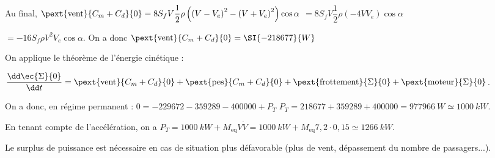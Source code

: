 \begin{multicols}{2}
\begin{corrige}
Au final, $\pext{\text{vent}}{C_m+C_d}{0} =8S_fV\dfrac{1}{2}\rho \left(\left(V-V_e\right)^2- \left(V+V_e\right)^2\right)\cos\alpha$ $=8S_fV\dfrac{1}{2}\rho\left( -4VV_e\right)\cos\alpha$

$=-16S_f \rho V^2 V_e\cos\alpha$. On a donc 
$\pext{\text{vent}}{C_m+C_d}{0} = \SI{-218677}{W} $
\end{corrige}\else\fi


\ifprof\begin{corrige}
On applique le théorème de l'énergie cinétique :

$\dfrac{\dd \ec{\Sigma}{0}}{\dd t} =\pext{\text{vent}}{C_m+C_d}{0} + \pext{\text{pes}}{C_m+C_d}{0} + \pext{\text{frottement}}{\Sigma}{0}+ \pext{\text{moteur}}{\Sigma}{0}$.

On a donc, en régime permanent : 
$0 = -229672-359289-400 000 +P_T $ $ P_T= 218677 + 359289 + 400 000 = \SI{977966}{W} \simeq \SI{1000}{kW}$.

En tenant compte de l'accélération, on a $P_T = \SI{1000}{kW}+  M_{\text{eq}} V\dot{V} =  \SI{1000}{kW}+  M_{\text{eq}} 7,2 \cdot 0,15 \simeq \SI{1266}{kW}$. 

Le surplus de puissance est nécessaire en cas de situation plus défavorable (plus de vent, dépassement du nombre de passagers...). 
\end{corrige}\else\fi

\ifprof
\else


\end{multicols}
